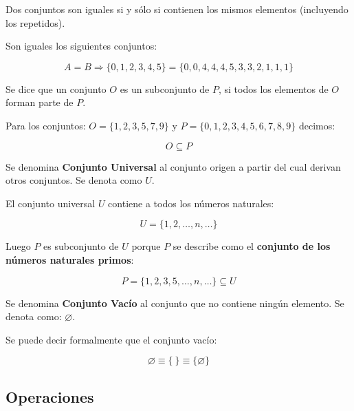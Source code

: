  Dos conjuntos son iguales si y sólo si contienen los mismos elementos
(incluyendo los repetidos).

\ejem Son iguales los siguientes conjuntos:

\begin{equation}
A = B \Rightarrow \{0,1,2,3,4,5\} = \{0,0,4,4,4,5,3,3,2,1,1,1\}
\end{equation}

 Se dice que un conjunto $O$ es un subconjunto de $P$, si todos los
elementos de $O$ forman parte de $P$.

\ejem Para los conjuntos: $O = \{1,2,3,5,7,9\}$ y $P = \{0,1,2,3,4,5,6,7,8,9\}$ 
decimos:

\begin{equation}
O \subseteq P
\end{equation}
 
 Se denomina \textbf{Conjunto Universal} al conjunto origen a partir
del cual derivan otros conjuntos. Se denota como
$U$.

\ejem El conjunto universal $U$ contiene a todos los números naturales:

\begin{equation}
U = \{1,2,\ldots,n,\ldots\}
\end{equation}

Luego $P$ es subconjunto de $U$ porque $P$ se describe como el \textbf{conjunto 
de los
números naturales primos}:

\begin{equation}
P = \{1,2,3,5,\ldots,n,\ldots\} \subseteq U
\end{equation}

 Se denomina \textbf{Conjunto Vacío} al conjunto que no contiene ningún 
elemento. Se
denota como: $\varnothing$.

\ejem Se puede decir formalmente que el conjunto vacío:

\begin{equation}
\varnothing \equiv \{\ \} \equiv \{ \varnothing \}
\end{equation}

\subsection{Operaciones}

